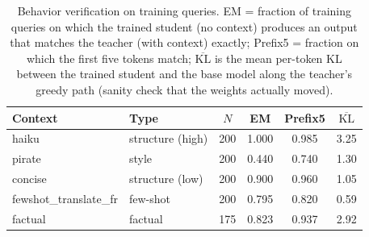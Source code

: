 \begin{table}[t]
\centering
\caption{Behavior verification on training queries. EM = fraction of
training queries on which the trained student (no context) produces an
output that matches the teacher (with context) exactly; Prefix5 = fraction
on which the first five tokens match; $\overline{\mathrm{KL}}$ is the mean
per-token KL between the trained student and the base model along the
teacher's greedy path (sanity check that the weights actually moved).}
\label{tab:behavior}
\begin{tabular}{llcccc}
\toprule
Context & Type & $N$ & EM & Prefix5 & $\overline{\mathrm{KL}}$ \\
\midrule
haiku                  & structure (high) & 200 & 1.000 & 0.985 & 3.25 \\
pirate                 & style            & 200 & 0.440 & 0.740 & 1.30 \\
concise                & structure (low)  & 200 & 0.900 & 0.960 & 1.05 \\
fewshot\_translate\_fr & few-shot         & 200 & 0.795 & 0.820 & 0.59 \\
factual                & factual          & 175 & 0.823 & 0.937 & 2.92 \\
\bottomrule
\end{tabular}
\end{table}
